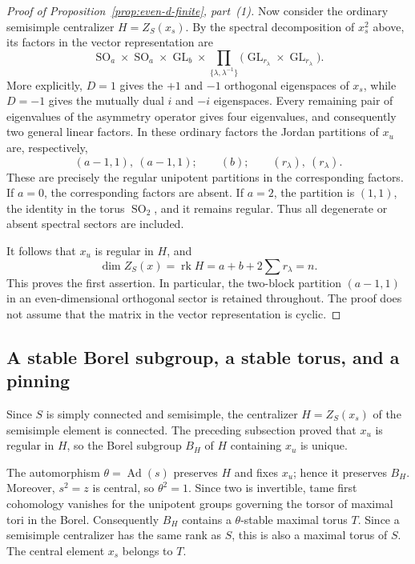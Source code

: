\documentclass[11pt,a4paper]{article}
\theoremstyle{definition}
\theoremstyle{remark}
\begin{document}
\begin{proof}[Proof of Proposition~\ref{prop:even-d-finite}, part~(1)]
Now consider the ordinary semisimple centralizer
\(H=Z_S(x_s)\). By the spectral decomposition of \(x_s^2\) above, its
factors in the vector representation are
\[
\operatorname{SO}_a\times\operatorname{SO}_a
\times\operatorname{GL}_b
\times
\prod_{\{\lambda,\lambda^{-1}\}}
\bigl(
\operatorname{GL}_{r_\lambda}
\times\operatorname{GL}_{r_\lambda}
\bigr).
\]
More explicitly, \(D=1\) gives the \(+1\) and \(-1\) orthogonal
eigenspaces of \(x_s\), while \(D=-1\) gives the mutually dual \(i\)
and \(-i\) eigenspaces. Every remaining pair of eigenvalues of the
asymmetry operator gives four eigenvalues, and consequently two general
linear factors. In these ordinary factors the Jordan partitions of
\(x_u\) are, respectively,
\[
(a-1,1),\ (a-1,1);
\qquad
(b);
\qquad
(r_\lambda),\ (r_\lambda).
\]
These are precisely the regular unipotent partitions in the
corresponding factors. If \(a=0\), the corresponding factors are absent.
If \(a=2\), the partition is \((1,1)\), the identity in the torus
\(\operatorname{SO}_2\), and it remains regular. Thus all degenerate or
absent spectral sectors are included.

It follows that \(x_u\) is regular in \(H\), and
\[
\dim Z_S(x)=\operatorname{rk}H
=a+b+2\sum r_\lambda=n.
\]
This proves the first assertion. In particular, the two-block
partition \((a-1,1)\) in an even-dimensional orthogonal sector is
retained throughout. The proof does not assume that the matrix in the
vector representation is cyclic.
\end{proof}

\subsection{A stable Borel subgroup, a stable torus, and a pinning}
\label{subsec:even-d-pinning}

Since \(S\) is simply connected and semisimple, the centralizer
\(H=Z_S(x_s)\) of the semisimple element is connected. The preceding
subsection proved that \(x_u\) is regular in \(H\), so the Borel
subgroup \(B_H\) of \(H\) containing \(x_u\) is unique.

The automorphism \(\theta=\operatorname{Ad}(s)\) preserves \(H\) and
fixes \(x_u\); hence it preserves \(B_H\). Moreover, \(s^2=z\) is
central, so \(\theta^2=1\). Since two is invertible, tame first
cohomology vanishes for the unipotent groups governing the torsor of
maximal tori in the Borel. Consequently \(B_H\) contains a
\(\theta\)-stable maximal torus \(T\). Since a semisimple centralizer
has the same rank as \(S\), this is also a maximal torus of \(S\).
The central element \(x_s\) belongs to \(T\).
\end{document}
